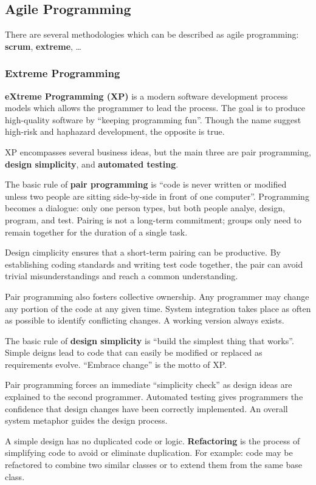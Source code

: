 \documentclass[12pt]{article}
\begin{document}
\subsection{Agile Programming}
There are several methodologies which can be described as agile programming: {\bf scrum}, {\bf extreme}, \dots

\subsubsection{Extreme Programming}
{\bf eXtreme Programming (XP)} is a modern software development process models which allows the programmer to lead the process. The goal is to produce high-quality software by ``keeping programming fun''. Though the name suggest high-risk and haphazard development, the opposite is true.

XP encompasses several business ideas, but the main three are pair programming, {\bf design simplicity}, and {\bf automated testing}.

The basic rule of {\bf pair programming} is ``code is never written or modified unless two people are sitting side-by-side in front of one computer''. Programming becomes a dialogue: only one person types, but both people analye, design, program, and test. Pairing is not a long-term commitment; groups only need to remain together for the duration of a single task.

Design cimplicity ensures that a short-term pairing can be productive. By establishing coding standards and writing test code together, the pair can avoid trivial misunderstandings and reach a common understanding.

Pair programming also fosters collective ownership. Any programmer may change any portion of the code at any given time. System integration takes place as often as possible to identify conflicting changes. A working version always exists.

The basic rule of {\bf design simplicity} is ``build the simplest thing that works''. Simple deigns lead to code that can easily be modified or replaced as requirements evolve. ``Embrace change'' is the motto of XP.

Pair programming forces an immediate ``simplicity check'' as design ideas are explained to the second programmer. Automated testing gives programmers the confidence that design changes have been correctly implemented. An overall system metaphor guides the design process.

A simple design has no duplicated code or logic. {\bf Refactoring} is the process of simplifying code to avoid or eliminate duplication. For example: code may be refactored to combine two similar classes or to extend them from the same base class.
\end{document}
